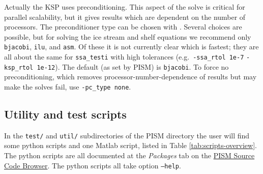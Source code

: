 Actually the KSP uses preconditioning.  This aspect of the solve is critical for parallel scalability, but it gives results which are dependent on the number of processors.  The preconditioner type can be chosen with . Several choices are possible, but for solving the ice stream and shelf equations we recommend only \texttt{bjacobi}, \texttt{ilu}, and \texttt{asm}.  Of these it is not currently clear which is fastest; they are all about the same for \texttt{ssa_testi} with high tolerances (e.g.~\texttt{-ssa_rtol 1e-7} \texttt{-ksp_rtol 1e-12}).  The default (as set by PISM) is \texttt{bjacobi}.  To force no preconditioning, which removes processor-number-dependence of results but may make the solves fail, use \texttt{-pc_type none}.


\subsection{Utility and test scripts} \label{subsect:scripts} In the \verb|test/| and \verb|util/| subdirectories of the PISM directory the user will find some python scripts and one Matlab script, listed in Table \ref{tab:scripts-overview}.  The python scripts are all documented at the \textsl{Packages} tab on the \href{http://www.pism-docs.org/doxy/html/index.html}{PISM Source Code Browser}.  The python scripts all take option \texttt{--help}.

\newcommand{\scripthead}[1]{\texttt{#1}}


